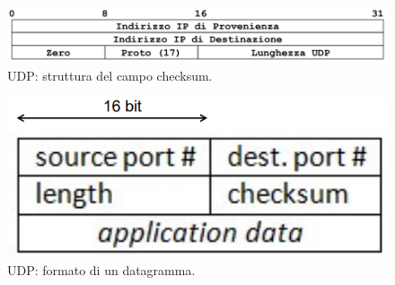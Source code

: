 \documentclass[11pt, italian, openany]{book}
\begin{document}
\begin{sloppypar}
\begin{figure}[!h]
	\centering
	\includegraphics[scale=0.5]{images/udp-checksum.png}
	\caption{UDP: struttura del campo checksum.}
	\label{fig:udp-checksum}
\end{figure}

\begin{figure}[!h]
	\centering
	\includegraphics[scale=0.5]{images/udp-datagramma.png}
	\caption{UDP: formato di un datagramma.}
	\label{fig:udp-datagramma}
\end{figure}


\end{sloppypar}
\end{document}
